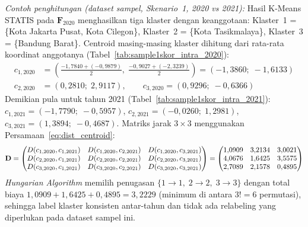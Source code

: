 \label{par:contoh_hungarian}
\noindent\textit{Contoh penghitungan (dataset sampel, Skenario~1, 2020 vs 2021):} Hasil K-Means STATIS pada $\mathbf{F}_{2020}$ menghasilkan tiga klaster dengan keanggotaan: Klaster~1 = \{Kota Jakarta Pusat, Kota Cilegon\}, Klaster~2 = \{Kota Tasikmalaya\}, Klaster~3 = \{Bandung Barat\}. Centroid masing-masing klaster dihitung dari rata-rata koordinat anggotanya (Tabel~\ref{tab:sample1skor_intra_2020}):
\begin{align*}
  c_{1,2020} &= \left(\tfrac{-1{,}7840+(-0{,}9879)}{2},\;\tfrac{-0{,}9027+(-2{,}3239)}{2}\right) = (-1{,}3860;\;-1{,}6133) \\
  c_{2,2020} &= (0{,}2810;\;2{,}9117), \qquad c_{3,2020} = (0{,}9296;\;-0{,}6366)
\end{align*}
Demikian pula untuk tahun 2021 (Tabel~\ref{tab:sample1skor_intra_2021}): $c_{1,2021}=(-1{,}7790;\;-0{,}5957)$, $c_{2,2021}=(-0{,}0260;\;1{,}2981)$, $c_{3,2021}=(1{,}3894;\;-0{,}4687)$. Matriks jarak $3\times3$ menggunakan Persamaan~\ref{eq:dist_centroid}:
\[
\scalebox{0.88}{$\displaystyle
\mathbf{D} =
\begin{pmatrix}
  D(c_{1,2020},c_{1,2021}) & D(c_{1,2020},c_{2,2021}) & D(c_{1,2020},c_{3,2021}) \\
  D(c_{2,2020},c_{1,2021}) & D(c_{2,2020},c_{2,2021}) & D(c_{2,2020},c_{3,2021}) \\
  D(c_{3,2020},c_{1,2021}) & D(c_{3,2020},c_{2,2021}) & D(c_{3,2020},c_{3,2021})
\end{pmatrix}
=
\begin{pmatrix}
  1{,}0909 & 3{,}2134 & 3{,}0021 \\
  4{,}0676 & 1{,}6425 & 3{,}5575 \\
  2{,}7089 & 2{,}1578 & 0{,}4895
\end{pmatrix}
$}
\]
\textit{Hungarian Algorithm} memilih penugasan $\{1\!\to\!1,\;2\!\to\!2,\;3\!\to\!3\}$ dengan total biaya $1{,}0909+1{,}6425+0{,}4895=3{,}2229$ (minimum di antara $3!=6$ permutasi), sehingga label klaster konsisten antar-tahun dan tidak ada relabeling yang diperlukan pada dataset sampel ini.

